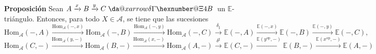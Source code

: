 \documentclass[preview]{standalone}
\makeatletter
\newcommand*{\da@xarrow}[7]{%
                                 \sbox0{$\ifx#7\scriptstyle\scriptscriptstyle\else\scriptstyle\fi#5#1#6\m@th$}%
                                 \sbox2{$\ifx#7\scriptstyle\scriptscriptstyle\else\scriptstyle\fi#5#2#6\m@th$}%
                                 \sbox4{$#7\dabar@\m@th$}%
                                 \dimen@=\wd0 %
                                 \ifdim\wd2 >\dimen@
                                   \dimen@=\wd2 %
                                 \fi
                                 \count@=2 %
                                 \def\da@bars{\dabar@\dabar@}%
                                 \@whiledim\count@\wd4<\dimen@\do{%
                                   \advance\count@\@ne
                                   \expandafter\def\expandafter\da@bars\expandafter{%
                                     \da@bars
                                     \dabar@ 
                                   }%
                                 }%
                                 \mathrel{#3}%
                                 \mathrel{%
                                   \mathop{\da@bars}\limits
                                   \ifx\\#1\\%
                                   \else
                                     _{\copy0}%
                                   \fi
                                   \ifx\\#2\\%
                                   \else
                                     ^{\copy2}%
                                   \fi
                                 }%
                                 \mathrel{#4}%
                               }
\newcommand*{\da@rightarrow}{\mathchar"0\hexnumber@\symAMSa 4B }
\newcommand*{\xdashrightarrow}[2][]{%
                                 \mathrel{%
                                   \mathpalette{\da@xarrow{#1}{#2}{}\da@rightarrow{\,}{}}{}%
                                 }%
                               }
\makeatother
\begin{document}
\begin{center}
\justifying \textbf{Proposición} Sean $A\xrightarrow{x} B\xrightarrow{y} C\xdashrightarrow{\delta}$ un $\mathbb{E}$-triángulo. Entonces, para todo $X\in\mathscr{A}$, se tiene que las sucesiones $$\text{Hom}_\mathscr{A}(-,A) \xrightarrow{\text{Hom}_\mathscr{A}(-,x)} \text{Hom}_\mathscr{A}(-,B) \xrightarrow{\text{Hom}_\mathscr{A}(-,y)} \text{Hom}_\mathscr{A}(-,C) \xrightarrow{\delta_\sharp} \mathbb{E}(-,A) \xrightarrow{\mathbb{E}(-,x)} \mathbb{E}(-,B) \xrightarrow{\mathbb{E}(-,y)} \mathbb{E}(-,C),$$ $$\text{Hom}_\mathscr{A}(C,-) \xrightarrow{\text{Hom}_\mathscr{A}(y,-)} \text{Hom}_\mathscr{A}(B,-) \xrightarrow{\text{Hom}_\mathscr{A}(x,-)} \text{Hom}_\mathscr{A}(A,-) \xrightarrow{\delta^\sharp} \mathbb{E}(C,-) \xrightarrow{\mathbb{E}(y^\text{op},-)} \mathbb{E}(B,-) \xrightarrow{\mathbb{E}(x^\text{op},-)} \mathbb{E}(A,-)$$
\end{center}
\end{document}
